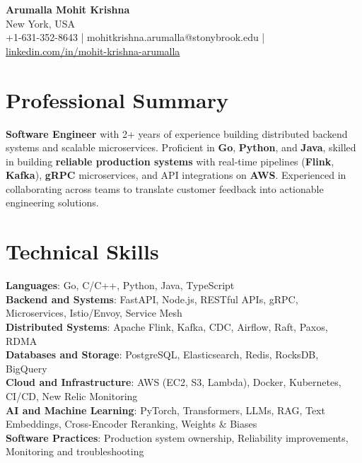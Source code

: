 \documentclass[letterpaper,11pt]{article}
\begin{document}
\begin{center}
  {\Large \textbf{Arumalla Mohit Krishna}} \\
  New York, USA \\
  +1-631-352-8643 \enspace | \enspace mohitkrishna.arumalla@stonybrook.edu \enspace | \enspace \href{https://www.linkedin.com/in/mohit-krishna-arumalla}{linkedin.com/in/mohit-krishna-arumalla}
\end{center}

\section{Professional Summary}
  \begin{itemize}[leftmargin=0.15in, label={}]
    \small{\item{
     \textbf{Software Engineer} with 2+ years of experience building distributed backend systems and scalable microservices. Proficient in \textbf{Go}, \textbf{Python}, and \textbf{Java}, skilled in building \textbf{reliable production systems} with real-time pipelines (\textbf{Flink}, \textbf{Kafka}), \textbf{gRPC} microservices, and API integrations on \textbf{AWS}. Experienced in collaborating across teams to translate customer feedback into actionable engineering solutions.
    }}
  \end{itemize}
\vspace{-16pt}

\section{Technical Skills}
 \begin{itemize}[leftmargin=0.15in, label={}]
    \small{\item{
     \textbf{Languages}: Go, C/C++, Python, Java, TypeScript \\
     \textbf{Backend and Systems}: FastAPI, Node.js, RESTful APIs, gRPC, Microservices, Istio/Envoy, Service Mesh \\
     \textbf{Distributed Systems}: Apache Flink, Kafka, CDC, Airflow, Raft, Paxos, RDMA \\
     \textbf{Databases and Storage}: PostgreSQL, Elasticsearch, Redis, RocksDB, BigQuery \\
     \textbf{Cloud and Infrastructure}: AWS (EC2, S3, Lambda), Docker, Kubernetes, CI/CD, New Relic Monitoring \\
     \textbf{AI and Machine Learning}: PyTorch, Transformers, LLMs, RAG, Text Embeddings, Cross-Encoder Reranking, Weights \& Biases \\
     \textbf{Software Practices}: Production system ownership, Reliability improvements, Monitoring and troubleshooting
    }}
 \end{itemize}
\vspace{-16pt}
\end{document}
